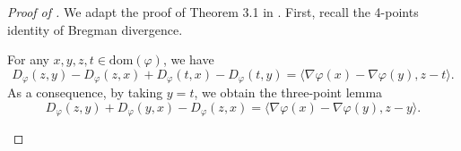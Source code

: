 \begin{proof}[Proof of ]
We adapt the proof of Theorem 3.1 in \citep{Lu18}.
First, recall the 4-points identity of Bregman divergence.
\begin{lemma}
    \label{lemma:four-points}
    For any $x, y, z, t \in \text{dom}(\varphi)$, we have
    \begin{equation}
    D_{\varphi}(z, y) - D_{\varphi}(z,x) + D_{\varphi}(t, x) - D_{\varphi}(t, y)
    = \langle \nabla \varphi(x) - \nabla \varphi(y), z - t \rangle.
    \end{equation}
    As a consequence, by taking $y = t$, we obtain the three-point lemma
    \begin{equation}
    D_{\varphi}(z, y) + D_{\varphi}(y, x) - D_{\varphi}(z, x)
    = \langle \nabla \varphi(x) - \nabla \varphi(y), z - y \rangle.
    \end{equation}
\end{lemma}


\end{proof}
